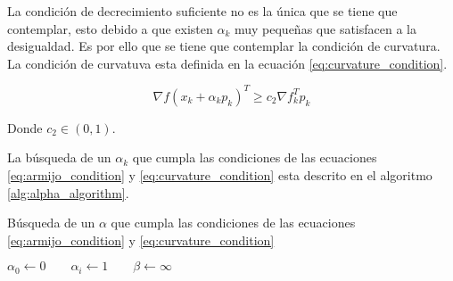 La condición de decrecimiento suficiente no es la única que se tiene que contemplar, esto debido a que existen $\alpha_k$ muy pequeñas que satisfacen a la desigualdad. Es por ello que se tiene que contemplar la condición de curvatura. La condición de curvatuva esta definida en la ecuación \ref{eq:curvature_condition}.

\begin{equation}
    \nabla f(x_k + \alpha_k p_k)^T  \geq c_2 \nabla f_k^T p_k  \label{eq:curvature_condition}
\end{equation}

Donde $c_2 \in (0,1)$.


La búsqueda de un $\alpha_k$ que cumpla las condiciones de las ecuaciones \ref{eq:armijo_condition} y \ref{eq:curvature_condition} esta descrito en el algoritmo \ref{alg:alpha_algorithm}.

\begin{algorithm}
    \caption{Búsqueda de un $\alpha$ que cumpla las condiciones de las ecuaciones \ref{eq:armijo_condition} y \ref{eq:curvature_condition} \label{alg:alpha_algorithm}}
    $\alpha_0 \gets 0 \qquad \alpha_i \gets 1 \qquad \beta \gets \infty$\\
\end{algorithm}